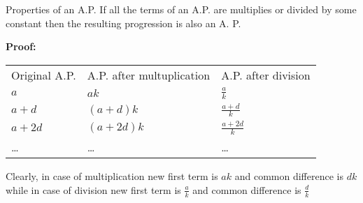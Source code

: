 \documentclass[aspectratio=1610,8pt]{beamer}
\begin{document}
\begin{frame}{Properties of an A.P.}
  If all the terms of an A.P. are multiplies or divided by some constant then
  the resulting progression is also an A. P.

  \textbf{Proof:}\\
  \begin{tabular}{lll}
    Original A.P.&A.P. after multuplication& A.P. after division\\
    $a$& $ak$ & $\frac{a}{k}$\\
    $a + d$ & $(a + d)k$ & $\frac{a + d}{k}$\\
    $a + 2d$ & $(a + 2d)k$ & $\frac{a + 2d}{k}$\\
    \ldots & \ldots & \ldots
  \end{tabular}

  Clearly, in case of multiplication new first term is $ak$ and common
  difference is $dk$ while in case of division new first term is $\frac{a}{k}$
  and common difference is $\frac{d}{k}$
\end{frame}
\end{document}

